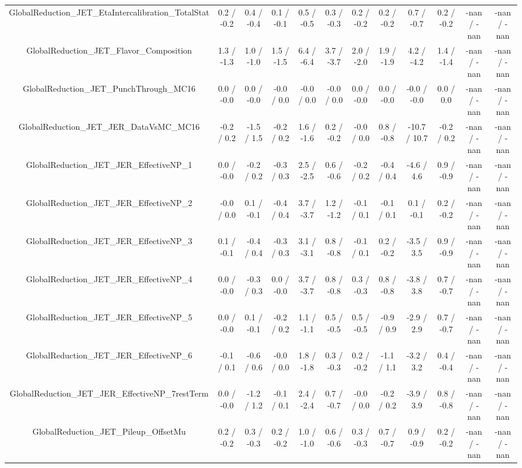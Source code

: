 \begin{table}[htbp]
\begin{center}
\begin{tabular}{|c|c|c|c|c|c|c|c|c|c|c|c|}
  GlobalReduction_JET_EtaIntercalibration_TotalStat & 0.2 / -0.2 & 0.4 / -0.4 & 0.1 / -0.1 & 0.5 / -0.5 & 0.3 / -0.3 & 0.2 / -0.2 & 0.2 / -0.2 & 0.7 / -0.7 & 0.2 / -0.2 & -nan / -nan & -nan / -nan \\ 
  GlobalReduction_JET_Flavor_Composition & 1.3 / -1.3 & 1.0 / -1.0 & 1.5 / -1.5 & 6.4 / -6.4 & 3.7 / -3.7 & 2.0 / -2.0 & 1.9 / -1.9 & 4.2 / -4.2 & 1.4 / -1.4 & -nan / -nan & -nan / -nan \\ 
  GlobalReduction_JET_PunchThrough_MC16 & 0.0 / -0.0 & 0.0 / -0.0 & -0.0 / 0.0 & -0.0 / 0.0 & -0.0 / 0.0 & 0.0 / -0.0 & 0.0 / -0.0 & -0.0 / -0.0 & 0.0 / 0.0 & -nan / -nan & -nan / -nan \\ 
  GlobalReduction_JET_JER_DataVsMC_MC16 & -0.2 / 0.2 & -1.5 / 1.5 & -0.2 / 0.2 & 1.6 / -1.6 & 0.2 / -0.2 & -0.0 / 0.0 & 0.8 / -0.8 & -10.7 / 10.7 & -0.2 / 0.2 & -nan / -nan & -nan / -nan \\ 
  GlobalReduction_JET_JER_EffectiveNP_1 & 0.0 / -0.0 & -0.2 / 0.2 & -0.3 / 0.3 & 2.5 / -2.5 & 0.6 / -0.6 & -0.2 / 0.2 & -0.4 / 0.4 & -4.6 / 4.6 & 0.9 / -0.9 & -nan / -nan & -nan / -nan \\ 
  GlobalReduction_JET_JER_EffectiveNP_2 & -0.0 / 0.0 & 0.1 / -0.1 & -0.4 / 0.4 & 3.7 / -3.7 & 1.2 / -1.2 & -0.1 / 0.1 & -0.1 / 0.1 & 0.1 / -0.1 & 0.2 / -0.2 & -nan / -nan & -nan / -nan \\ 
  GlobalReduction_JET_JER_EffectiveNP_3 & 0.1 / -0.1 & -0.4 / 0.4 & -0.3 / 0.3 & 3.1 / -3.1 & 0.8 / -0.8 & -0.1 / 0.1 & 0.2 / -0.2 & -3.5 / 3.5 & 0.9 / -0.9 & -nan / -nan & -nan / -nan \\ 
  GlobalReduction_JET_JER_EffectiveNP_4 & 0.0 / -0.0 & -0.3 / 0.3 & 0.0 / -0.0 & 3.7 / -3.7 & 0.8 / -0.8 & 0.3 / -0.3 & 0.8 / -0.8 & -3.8 / 3.8 & 0.7 / -0.7 & -nan / -nan & -nan / -nan \\ 
  GlobalReduction_JET_JER_EffectiveNP_5 & 0.0 / -0.0 & 0.1 / -0.1 & -0.2 / 0.2 & 1.1 / -1.1 & 0.5 / -0.5 & 0.5 / -0.5 & -0.9 / 0.9 & -2.9 / 2.9 & 0.7 / -0.7 & -nan / -nan & -nan / -nan \\ 
  GlobalReduction_JET_JER_EffectiveNP_6 & -0.1 / 0.1 & -0.6 / 0.6 & -0.0 / 0.0 & 1.8 / -1.8 & 0.3 / -0.3 & 0.2 / -0.2 & -1.1 / 1.1 & -3.2 / 3.2 & 0.4 / -0.4 & -nan / -nan & -nan / -nan \\ 
  GlobalReduction_JET_JER_EffectiveNP_7restTerm & 0.0 / -0.0 & -1.2 / 1.2 & -0.1 / 0.1 & 2.4 / -2.4 & 0.7 / -0.7 & -0.0 / 0.0 & -0.2 / 0.2 & -3.9 / 3.9 & 0.8 / -0.8 & -nan / -nan & -nan / -nan \\ 
  GlobalReduction_JET_Pileup_OffsetMu & 0.2 / -0.2 & 0.3 / -0.3 & 0.2 / -0.2 & 1.0 / -1.0 & 0.6 / -0.6 & 0.3 / -0.3 & 0.7 / -0.7 & 0.9 / -0.9 & 0.2 / -0.2 & -nan / -nan & -nan / -nan \\ 

\end{tabular}
\end{center}
\end{table}
